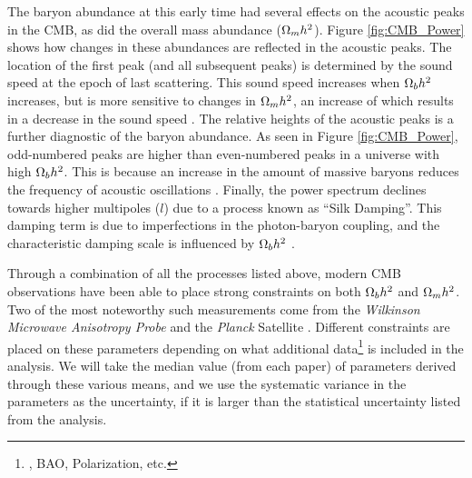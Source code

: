 The baryon abundance at this early time had several effects on the
acoustic peaks in the CMB, as did the overall mass abundance ($\Omega_m
h^2$). Figure \ref{fig:CMB_Power} shows how changes in these
abundances are reflected in the acoustic peaks. The location of the
first peak (and all subsequent peaks) is determined by the sound speed
at the epoch of last scattering. This sound speed increases when
$\Omega_b h^2$ increases, but is more sensitive to changes in $\Omega_m
h^2$, an increase of which results in a decrease in the sound speed
\citep[][ch.~9.8]{Mukhanov2005}. The relative heights of the acoustic
peaks is a further diagnostic of the baryon abundance. As seen in
Figure \ref{fig:CMB_Power}, odd-numbered peaks are higher than
even-numbered peaks in a universe with high $\Omega_b h^2$. This is
because an increase in the amount of massive baryons reduces the
frequency of acoustic oscillations
\citep[][ch.~8.7.3]{Dodelson2003}. Finally, the power spectrum
declines towards higher multipoles ($l$) due to a process known as
``Silk Damping''. This damping term is due to imperfections in the
photon-baryon coupling, and the characteristic damping scale is
influenced by $\Omega_b h^2$ \citep[][ch.~4.7]{Durrer2008}.

Through a combination of all the processes listed above, modern CMB
observations have been able to place strong constraints on both
$\Omega_b h^2$ and $\Omega_m h^2$. Two of the most noteworthy such
measurements come from the \textit{Wilkinson Microwave Anisotropy
  Probe} \citep[WMAP][]{Bennett2003} and the \textit{Planck} Satellite
\citep{PlanckResultsI}. Different constraints are placed on these
parameters depending on what additional data\footnote{\Ho, BAO,
  Polarization, etc.} is included in the analysis. We will take the
median value (from each paper) of parameters derived through these
various means, and we use the systematic variance in the parameters as
the uncertainty, if it is larger than the statistical uncertainty
listed from the analysis.

